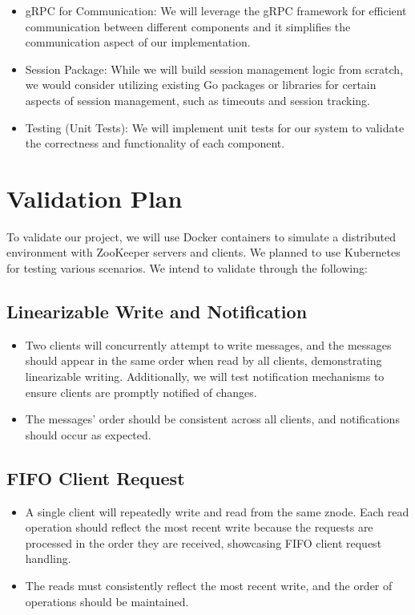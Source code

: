 \documentclass[
course = 50.041,
assignmenttype = {{Jaguard}},
assignment = {{}},
name = {{Group 5}},
studentnumber = {{Report}}
]{style}
\begin{document}
\begin{itemize}
    \item gRPC for Communication: We will leverage the gRPC framework for efficient communication between different components and it simplifies the communication aspect of our implementation.
    \item Session Package: While we will build session management logic from scratch, we would consider utilizing existing Go packages or libraries for certain aspects of session management, such as timeouts and session tracking.
    \item Testing (Unit Tests): We will implement unit tests for our system to validate the correctness and functionality of each component. 
\end{itemize}

\section{Validation Plan}

To validate our project, we will use Docker containers to simulate a distributed environment with ZooKeeper servers and clients. We planned to use Kubernetes for testing various scenarios. We intend to validate through the following:

\subsection{Linearizable Write and Notification}
\begin{itemize}
    \item Two clients will concurrently attempt to write messages, and the messages should appear in the same order when read by all clients, demonstrating linearizable writing. Additionally, we will test notification mechanisms to ensure clients are promptly notified of changes.
    \item The messages' order should be consistent across all clients, and notifications should occur as expected.
\end{itemize}

\subsection{FIFO Client Request}
\begin{itemize}
    \item A single client will repeatedly write and read from the same znode. Each read operation should reflect the most recent write because the requests are processed in the order they are received, showcasing FIFO client request handling.
    \item The reads must consistently reflect the most recent write, and the order of operations should be maintained.
\end{itemize}
\end{document}
